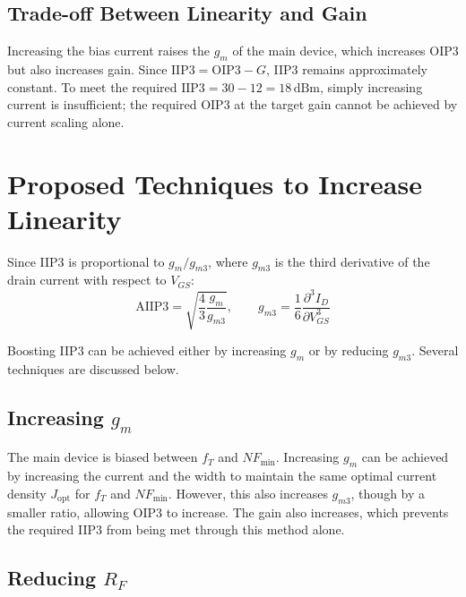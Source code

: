 \subsection{Trade-off Between Linearity and Gain}
\label{subsec:tradeoff_lin_gain}

Increasing the bias current raises the $g_m$ of the main device, which increases OIP3 but also increases gain. Since $\text{IIP3} = \text{OIP3} - G$, IIP3 remains approximately constant. To meet the required $\text{IIP3} = 30 - 12 = 18\,\text{dBm}$, simply increasing current is insufficient; the required OIP3 at the target gain cannot be achieved by current scaling alone.

\section{Proposed Techniques to Increase Linearity}
\label{sec:linearity_techniques}

Since IIP3 is proportional to $g_m / g_{m3}$, where $g_{m3}$ is the third derivative of the drain current with respect to $V_{GS}$:
\begin{equation}
    \text{AIIP3} = \sqrt{\frac{4}{3} \frac{g_m}{g_{m3}}}, \qquad g_{m3} = \frac{1}{6} \frac{\partial^3 I_D}{\partial V_{GS}^3}
    \label{eq:IIP3}
\end{equation}

Boosting IIP3 can be achieved either by increasing $g_m$ or by reducing $g_{m3}$. Several techniques are discussed below.

\subsection{Increasing $g_m$}
\label{subsec:increase_gm}

The main device is biased between $f_T$ and $NF_\text{min}$. Increasing $g_m$ can be achieved by increasing the current and the width to maintain the same optimal current density $J_\text{opt}$ for $f_T$ and $NF_\text{min}$. However, this also increases $g_{m3}$, though by a smaller ratio, allowing OIP3 to increase. The gain also increases, which prevents the required IIP3 from being met through this method alone.

\subsection{Reducing $R_F$}
\label{subsec:reduce_RF}

